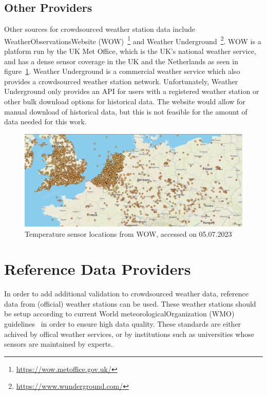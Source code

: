 \subsection{Other Providers}

Other sources for crowdsourced weather station data include WeatherObservationsWebsite (WOW)~\footnote{\url{https://wow.metoffice.gov.uk/}} and Weather Underground~\footnote{\url{https://www.wunderground.com/}}.
WOW is a platform run by the UK Met Office, which is the UK's national weather service, and has a dense sensor coverage in the UK and the Netherlands as seen in figure~\ref{fig:wow sensor locations}.
Weather Underground is a commercial weather service which also provides a crowdsourced weather station network. Unfortunately, Weather Underground only provides an API for users with a registered weather station or other bulk download options for historical data. The website would allow for manual download of historical data, but this is not feasible for the amount of data needed for this work.

\begin{figure}[ht]
    \centering
    \includegraphics[width=1\textwidth]{images/wow_sensor_locations.png}
    \caption{Temperature sensor locations from WOW, accessed on 05.07.2023}
    \label{fig:wow sensor locations}
\end{figure}

\section{Reference Data Providers}

In order to add additional validation to crowdsourced weather data, reference data from (official) weather stations can be used. These weather stations should be setup according to current World meteorologicalOrganization (WMO) guidelines~\cite{wmo2018guide} in order to ensure high data quality. These standards are either achived by offical weather services, or by institutions such as universities whose sensors are maintained by experts.

